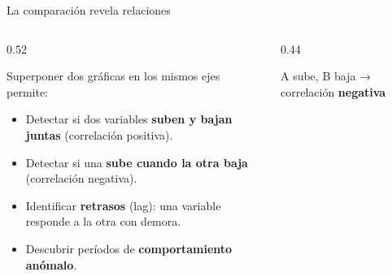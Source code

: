 \documentclass[aspectratio=169, 10pt, spanish]{beamer}
\begin{document}
\begin{frame}{La comparación revela relaciones}
  \begin{columns}[c]
    \begin{column}{0.52\textwidth}
      \begin{teoriabox}
        Superponer dos gráficas en los mismos ejes permite:
        \begin{itemize}
          \item Detectar si dos variables
                \textbf{suben y bajan juntas}
                (correlación positiva).
          \item Detectar si una \textbf{sube cuando
                la otra baja} (correlación negativa).
          \item Identificar \textbf{retrasos} (lag):
                una variable responde a la otra con demora.
          \item Descubrir períodos de
                \textbf{comportamiento anómalo}.
        \end{itemize}
      \end{teoriabox}
    \end{column}
    \begin{column}{0.44\textwidth}
      \begin{center}
        \AlmFontSmall\color{AlmGris}
        A sube, B baja → correlación \textbf{negativa}
      \end{center}
    \end{column}
  \end{columns}
\end{frame}

\end{document}

